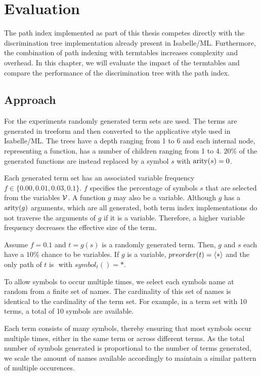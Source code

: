\chapter{Evaluation}
The path index implemented as part of this thesis competes directly with the discrimination tree implementation already present in Isabelle/ML. Furthermore, the combination of path indexing with termtables increases complexity and overhead. In this chapter, we will evaluate the impact of the termtables and compare the performance of the discrimination tree with the path index.

\section{Approach} \label{approach}
For the experiments randomly generated term sets are used. The terms are generated in treeform and then converted to the applicative style used in Isabelle/ML. The trees have a depth ranging from 1 to 6 and each internal node, representing a function, has a number of children ranging from 1 to 4. $20\%$ of the generated functions are instead replaced by a symbol $s$ with $\mathrm{arity} (s) = 0$.

Each generated term set has an associated variable frequency $f \in \{0.00, 0.01, 0.03, 0.1\}$. $f$ specifies the percentage of symbols $s$ that are selected from the variables $\mathcal{V}$. A function $g$ may also be a variable. Although $g$ has a $\mathrm{arity}(g)$ arguments, which are all generated, both term index implementations do not traverse the arguments of $g$ if it is a variable. Therefore, a higher variable frequency decreases the effective size of the term.

\begin{exmpl}
  Assume $f = 0.1$ and $t = g(s)$ is a randomly generated term. Then, $g$ and $s$ each have a $10\%$ chance to be variables. If $g$ is a variable, $preorder(t) = \langle * \rangle$ and the only path of $t$ is $\ang{}$ with $symbol_{t}(\ang{}) = *$.
\end{exmpl}

To allow symbols to occur multiple times, we select each symbols name at random from a finite set of names. The cardinality of this set of names is identical to the cardinality of the term set. For example, in a term set with 10 terms, a total of 10 symbols are available.

Each term consists of many symbols, thereby ensuring that most symbols occur multiple times, either in the same term or across different terms. As the total number of symbols generated is proportional to the number of terms generated, we scale the amount of names available accordingly to maintain a similar pattern of multiple occurences.

